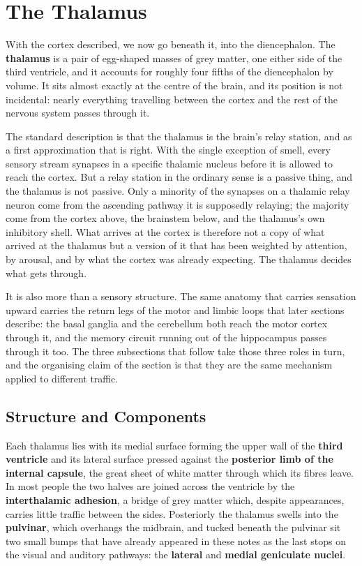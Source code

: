 \documentclass[11pt]{article}
\begin{document}
\section{The Thalamus}

With the cortex described, we now go beneath it, into the diencephalon. The \textbf{thalamus} is a pair of egg-shaped masses of grey matter, one either side of the third ventricle, and it accounts for roughly four fifths of the diencephalon by volume. It sits almost exactly at the centre of the brain, and its position is not incidental: nearly everything travelling between the cortex and the rest of the nervous system passes through it.

The standard description is that the thalamus is the brain's relay station, and as a first approximation that is right. With the single exception of smell, every sensory stream synapses in a specific thalamic nucleus before it is allowed to reach the cortex. But a relay station in the ordinary sense is a passive thing, and the thalamus is not passive. Only a minority of the synapses on a thalamic relay neuron come from the ascending pathway it is supposedly relaying; the majority come from the cortex above, the brainstem below, and the thalamus's own inhibitory shell. What arrives at the cortex is therefore not a copy of what arrived at the thalamus but a version of it that has been weighted by attention, by arousal, and by what the cortex was already expecting. The thalamus decides what gets through.

It is also more than a sensory structure. The same anatomy that carries sensation upward carries the return legs of the motor and limbic loops that later sections describe: the basal ganglia and the cerebellum both reach the motor cortex through it, and the memory circuit running out of the hippocampus passes through it too. The three subsections that follow take those three roles in turn, and the organising claim of the section is that they are the same mechanism applied to different traffic.

\subsection{Structure and Components}

Each thalamus lies with its medial surface forming the upper wall of the \textbf{third ventricle} and its lateral surface pressed against the \textbf{posterior limb of the internal capsule}, the great sheet of white matter through which its fibres leave. In most people the two halves are joined across the ventricle by the \textbf{interthalamic adhesion}, a bridge of grey matter which, despite appearances, carries little traffic between the sides. Posteriorly the thalamus swells into the \textbf{pulvinar}, which overhangs the midbrain, and tucked beneath the pulvinar sit two small bumps that have already appeared in these notes as the last stops on the visual and auditory pathways: the \textbf{lateral} and \textbf{medial geniculate nuclei}.
\end{document}
